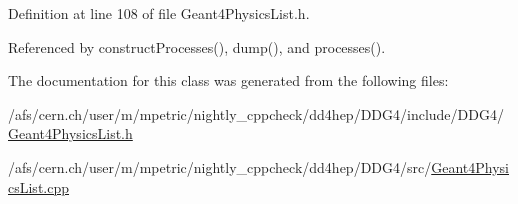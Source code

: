 Definition at line 108 of file Geant4PhysicsList.h.

Referenced by constructProcesses(), dump(), and processes().

The documentation for this class was generated from the following files:\begin{DoxyCompactItemize}
\item 
/afs/cern.ch/user/m/mpetric/nightly\_\-cppcheck/dd4hep/DDG4/include/DDG4/\hyperlink{_geant4_physics_list_8h}{Geant4PhysicsList.h}\item 
/afs/cern.ch/user/m/mpetric/nightly\_\-cppcheck/dd4hep/DDG4/src/\hyperlink{_geant4_physics_list_8cpp}{Geant4PhysicsList.cpp}\end{DoxyCompactItemize}
